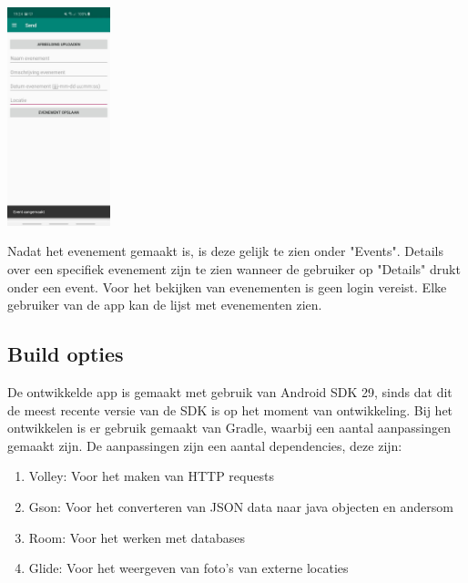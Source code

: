 \documentclass[dutch]{report}
\begin{document}
	\begin{minipage}{0.33\textwidth}
		\begin{center}
			\includegraphics[width=3cm]{images/FOTOEVENTAANGEMAAKT.jpg}
		\end{center}
	\end{minipage}
	
	Nadat het evenement gemaakt is, is deze gelijk te zien onder "Events". 
	Details over een specifiek evenement zijn te zien wanneer de gebruiker op "Details" drukt onder een event.
	Voor het bekijken van evenementen is geen login vereist. Elke gebruiker van de app kan de lijst met evenementen zien.
	
	\subsection{Build opties}
	De ontwikkelde app is gemaakt met gebruik van Android SDK 29, sinds dat dit de meest recente versie van de SDK is op het moment van ontwikkeling.
	Bij het ontwikkelen is er gebruik gemaakt van Gradle, waarbij een aantal aanpassingen gemaakt zijn. De aanpassingen zijn  een aantal dependencies, deze zijn:
	 \begin{enumerate}
	 	\item Volley: Voor het maken van HTTP requests
	 	\item Gson: Voor het converteren van JSON data naar java objecten en andersom
	 	\item Room: Voor het werken met databases
	 	\item Glide: Voor het weergeven van foto's van externe locaties
	 \end{enumerate}
 	\newpage
\end{document}
